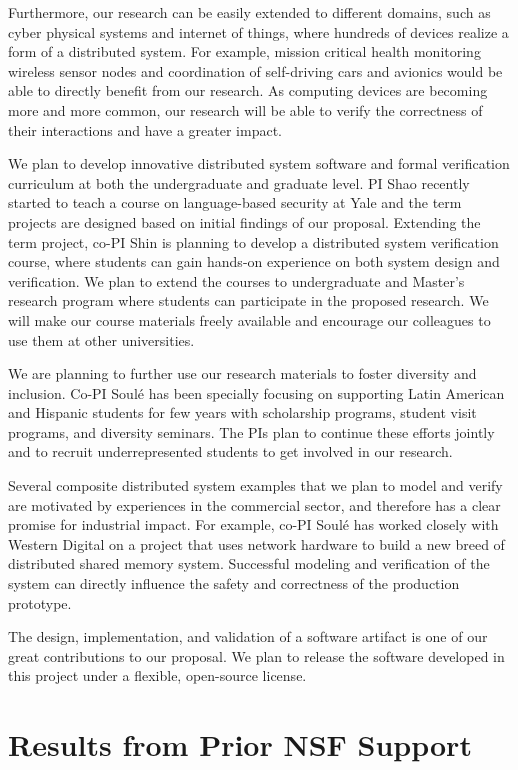 \documentclass[11pt]{article}
\begin{document}
Furthermore, our research can be easily extended to different domains,
such as cyber physical systems and internet of things, where hundreds
of devices realize a form of a distributed system. For example,
mission critical health monitoring wireless sensor nodes and
coordination of self-driving cars and avionics would be able to
directly benefit from our research. As computing devices are becoming
more and more common, our research will be able to verify the
correctness of their interactions and have a greater impact.

We plan to develop innovative distributed system software and formal
verification curriculum at both the undergraduate and graduate
level. PI Shao recently started to teach a course on language-based
security at Yale and the term projects are designed based on initial
findings of our proposal.  Extending the term project, co-PI Shin is
planning to develop a distributed system verification course, where
students can gain hands-on experience on both system design and
verification. We plan to extend the courses to undergraduate and
Master's research program where students can participate in the
proposed research. We will make our course materials freely available
and encourage our colleagues to use them at other universities.

We are planning to further use our research materials to foster
diversity and inclusion. Co-PI Soul\'e has been specially focusing
on supporting Latin American and Hispanic students for few years with
scholarship programs, student visit programs, and diversity seminars. 
The PIs plan to continue these efforts jointly and to recruit 
underrepresented students to get involved in our research.

Several composite distributed system examples that we plan to model
and verify are motivated by experiences in the commercial sector, 
and therefore has a clear promise for industrial impact. 
For example, co-PI Soul\'{e} has worked closely with Western Digital 
on a project that uses network hardware to build a new breed of 
distributed shared memory system. Successful modeling and
verification of the system can directly influence the safety and 
correctness of the production prototype. 

The design, implementation, and validation of a software artifact 
is one of our great contributions to our proposal. 
We plan to release the software developed in this project under 
a flexible, open-source license.


\section{Results from Prior NSF Support}
\label{ssec:prior}
\end{document}
